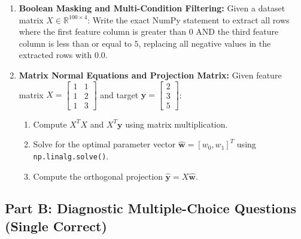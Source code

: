 \begin{enumerate}
    \item \textbf{Boolean Masking and Multi-Condition Filtering:}
    Given a dataset matrix $X \in \mathbb{R}^{100 \times 4}$:
    Write the exact NumPy statement to extract all rows where the first feature column is greater than $0$ AND the third feature column is less than or equal to $5$, replacing all negative values in the extracted rows with $0.0$.

    \item \textbf{Matrix Normal Equations and Projection Matrix:}
    Given feature matrix $X = \begin{bmatrix} 1 & 1 \\ 1 & 2 \\ 1 & 3 \end{bmatrix}$ and target $\mathbf{y} = \begin{bmatrix} 2 \\ 3 \\ 5 \end{bmatrix}$:
    \begin{enumerate}
        \item Compute $X^T X$ and $X^T \mathbf{y}$ using matrix multiplication.
        \item Solve for the optimal parameter vector $\hat{\mathbf{w}} = [w_0, w_1]^T$ using \texttt{np.linalg.solve()}.
        \item Compute the orthogonal projection $\hat{\mathbf{y}} = X \hat{\mathbf{w}}$.
    \end{enumerate}
\end{enumerate}

\subsection*{Part B: Diagnostic Multiple-Choice Questions (Single Correct)}

